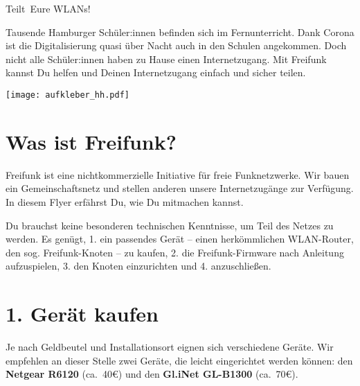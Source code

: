 \documentclass[10pt,a4paper,notumble]{leaflet}
\begin{document}


\begin{center}
{\fontsize{70}{90}\selectfont \faWifi}
\end{center}
\begin{center}
{\fontsize{30}{40}\selectfont Teilt\ Eure WLANs!}
\end{center}

\vfill

{\fontsize{13}{17}\selectfont Tausende Hamburger Schüler:innen befinden sich im Fernunterricht. Dank Corona ist die Digitalisierung quasi über Nacht auch in den Schulen angekommen. Doch nicht alle Schüler:innen haben zu Hause einen Internetzugang. Mit Freifunk kannst Du helfen und Deinen Internetzugang einfach und sicher teilen.\par}

\vspace{4em}

\begin{center}
\texttt{[image: aufkleber\_hh.pdf]}
\end{center}


\thispagestyle{empty}
\newpage

\section{Was ist Freifunk?}
Freifunk ist eine nichtkommerzielle Initiative für freie Funk\-netzwerke. Wir bauen ein Gemeinschaftsnetz und stellen anderen unsere Internetzugänge zur Verfügung. In diesem Flyer erfährst Du, wie Du mitmachen kannst.

Du brauchst keine besonderen technischen Kenntnisse, um Teil des Netzes zu werden. Es genügt, 1. ein passendes Gerät -- einen herkömmlichen WLAN-Router, den sog. Freifunk-Knoten -- zu kaufen, 2. die Freifunk-Firmware nach Anleitung aufzuspielen, 3. den Knoten einzurichten und 4. anzuschließen.


\section{1. Gerät kaufen}
Je nach Geldbeutel und Installationsort eignen sich verschiedene Geräte. Wir empfehlen an dieser Stelle zwei Geräte, die leicht eingerichtet werden können: den \textbf{Netgear R6120} (ca.~40€) und den \textbf{Gl.iNet GL-B1300} (ca.~70€).
\end{document}
